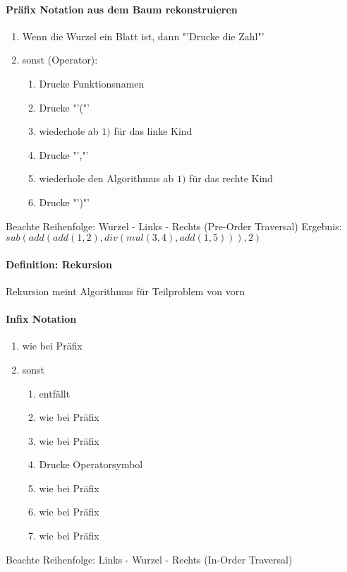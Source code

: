 \documentclass{article}
\begin{document}
	\paragraph{Präfix Notation aus dem Baum rekonstruieren}
	 		
	 \begin{enumerate}
	 	\item Wenn die Wurzel ein Blatt ist, dann "'Drucke die Zahl"'
	 	\item sonst (Operator):
	 	\begin{enumerate}
	 		\item Drucke Funktionsnamen
	 		\item Drucke "'("'
	 		\item wiederhole ab $1)$ für das linke Kind
	 		\item Drucke "',"'
	 		\item wiederhole den Algorithmus ab $1)$ für das rechte Kind
	 		\item Drucke "')"'
	 	\end{enumerate}
	 \end{enumerate}
	
		Beachte Reihenfolge: Wurzel - Links - Rechts (Pre-Order Traversal)
		Ergebnis: \\
		$sub(add(add(1,2), div(mul(3,4), add(1,5))),2)$
		
		\paragraph{Definition: Rekursion}
		Rekursion meint Algorithmus für Teilproblem von vorn
		
		\paragraph{Infix Notation}
		
		\begin{enumerate}
			\item wie bei Präfix
			\item sonst
			\begin{enumerate}
				\item entfällt
				\item wie bei Präfix
				\item wie bei Präfix
				\item Drucke Operatorsymbol
				\item wie bei Präfix 
				\item wie bei Präfix
				\item wie bei Präfix
			\end{enumerate}
		\end{enumerate}
		Beachte Reihenfolge: Links - Wurzel - Rechts (In-Order Traversal) \newline
		
\end{document}
